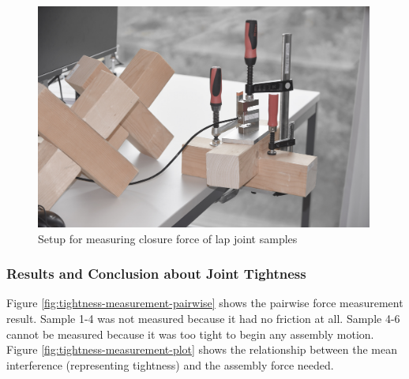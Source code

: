 \begin{figure}
    \centering
    \includegraphics[width=0.99\textwidth]{images/04-1+2/setup.jpg}
    \caption{Setup for measuring closure force of lap joint samples}
    \label{fig:interference-measurement-setup}
\end{figure}

\subsubsection{Results and Conclusion about Joint Tightness}

Figure \ref{fig:tightness-measurement-pairwise} shows the pairwise force measurement result. Sample 1-4 was not measured because it had no friction at all. Sample 4-6 cannot be measured because it was too tight to begin any assembly motion. Figure \ref{fig:tightness-measurement-plot} shows the relationship between the mean interference (representing tightness) and the assembly force needed. 

